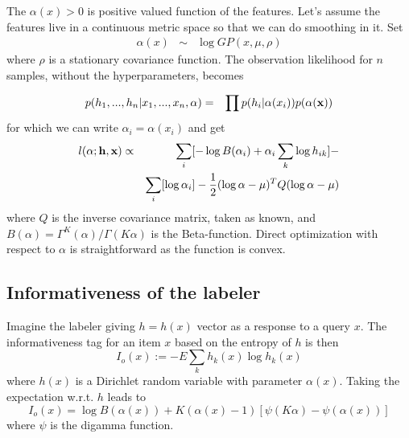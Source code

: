 \documentclass[10pt, onecolumn]{article}
\begin{document}
The $\alpha(x)>0$ is positive valued function of the features. Let's assume the features live in a continuous metric space so that we can do smoothing in it. Set 
\begin{eqnarray}
\alpha(x) & \sim & \log GP(x, \mu, \rho) 
\end{eqnarray}
where $\rho$ is a stationary covariance function. The observation likelihood for $n$ samples, without the hyperparameters, becomes

\begin{eqnarray}
p(h_1,...,h_n | x_1, ..., x_n , \alpha) &=& \prod p(h_i | \alpha(x_i)) p(\bold{\alpha(x)}) \\
\end{eqnarray}
for which we can write $\alpha_i=\alpha(x_i)$ and get
\begin{eqnarray}
l(\bold \alpha; \bold h, \bold x)&\propto& \sum_i [ -\log B(\alpha_i) + \alpha_i \sum_k \log h_{ik}] - \\
&& \sum_i [\log \alpha_i]  -\frac{1}{2}(\log \bold\alpha-\mu)^T Q (\log \bold\alpha - \mu)
\end{eqnarray}
where $Q$ is the inverse covariance matrix, taken as known, and $B(\alpha)=\Gamma^K(\alpha)/\Gamma(K\alpha)$ is the Beta-function. Direct optimization with respect to $\alpha$ is straightforward as the function is convex. 

\subsection{Informativeness of the labeler}
Imagine the labeler giving $h=h(x)$ vector as a response to a query $x$. The informativeness tag for an item $x$ based on the entropy of $h$ is then
$$I_o(x):= -E \sum_k h_k(x) \log h_k(x)$$
where $h(x)$ is a Dirichlet random variable with parameter $\alpha(x)$. Taking the expectation w.r.t. $h$ leads to
$$I_o(x) = \log B(\alpha(x)) + K(\alpha(x)-1)[\psi(K\alpha) - \psi(\alpha(x))]$$
where $\psi$ is the digamma function.
\end{document}
